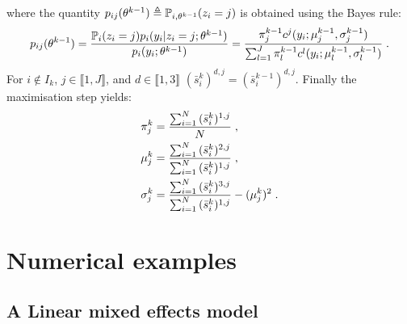 \documentclass[11pt]{article}
\theoremstyle{plain}
\begin{document}
\begin{exmp}
where the quantity $p_{ij}(\theta^{k-1}) \triangleq \mathbb{P}_{i,\theta^{k-1}}(z_i = j)$ is obtained using the Bayes rule:
\begin{equation}\label{gmm:condexpect}
p_{ij}(\theta^{k-1}) =\frac{\mathbb{P}_i(z_i = j)p_i(y_i|z_i=j;\theta^{k-1})}{p_i(y_i; \theta^{k-1})}=\frac{\pi_j^{k-1} c^j(y_i;\mu^{k-1}_j,\sigma^{k-1}_j)}{\sum_{l=1}^{J}\pi_l^{k-1}c^l(y_i;\mu_l^{k-1}, \sigma_l^{k-1})}\;.
\end{equation}
For $i \notin I_k$, $j \in \llbracket 1, J \rrbracket$, and $d \in \llbracket 1,3 \rrbracket$ $(\bar{s}_i^k)^{d,j} = (\bar{s}_i^{k-1})^{d,j}$.
Finally the maximisation step yields:
\begin{align}
& \pi_j^k = \frac{\sum_{i=1}^{N}{(\bar{s}_i^k)^{1,j}}}{N}\;,\\
& \mu_j^k = \frac{\sum_{i=1}^{N}{(\bar{s}_i^k)^{2,j}}}{\sum_{i=1}^{N}{(\bar{s}_i^k)^{1,j}}} \;,\\
& \sigma_j^k = \frac{\sum_{i=1}^{N}{(\bar{s}_i^k)^{3,j}}}{\sum_{i=1}^{N}{(\bar{s}_i^k)^{1,j}}} - (\mu_j^k)^2\;.
\end{align}
\end{exmp}
\newpage


\section{Numerical examples}\label{sec:numerical}
\subsection{A Linear mixed effects model}
\end{document}
